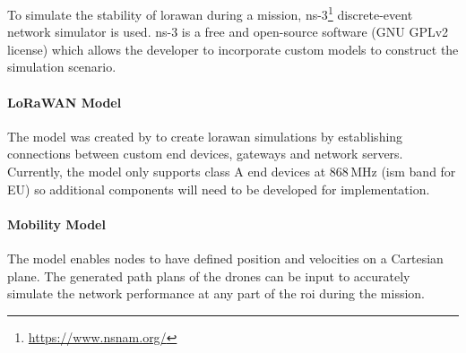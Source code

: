 To simulate the stability of \gls{lorawan} during a mission, ns-3\footnote{\url{https://www.nsnam.org/}} discrete-event network simulator is used. ns-3 is a free and open-source software (GNU GPLv2 license) which allows the developer to incorporate custom models to construct the simulation scenario. 

\paragraph{LoRaWAN Model} The model was created by \cite{magrin2017lora} to create \gls{lorawan} simulations by establishing connections between custom end devices, gateways and network servers. Currently, the model only supports class A end devices at 868\,MHz (\gls{ism} band for EU) so additional components will need to be developed for implementation. 

\paragraph{Mobility Model} The model enables nodes to have defined position and velocities on a Cartesian plane. The generated path plans of the drones can be input to accurately simulate the network performance at any part of the \gls{roi} during the mission. 
